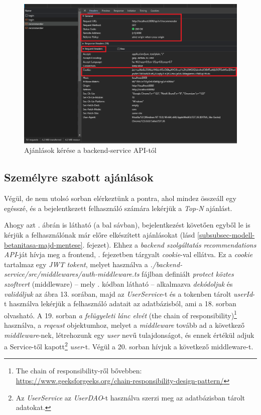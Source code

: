 \documentclass[
]{thesis-ekf}
\theoremstyle{definition}
\theoremstyle{remark}
\begin{document}
\begin{figure}[H]
	\centering
	\includegraphics[width=14cm]{images/frontend-recommender-request.png}
	\caption[Ajánlások kérése a backend-service API-tól]{Ajánlások kérése a backend-service API-tól}
	\label{fig-frontend-rec-request-cookies}
\end{figure}

\subsection{Személyre szabott ajánlások}
Végül, de nem utolsó sorban elérkeztünk a pontra, ahol mindez összeáll egy egésszé, és a bejelentkezett felhasználó számára lekérjük a \emph{Top-N} ajánlást.

Ahogy azt . ábrán is látható (a bal sávban), bejelentkezést követően egyből le is kérjük a felhasználónak már előre elkészített ajánlásokat (lásd \ref{subsubsec-modell-betanitasa-majd-mentese}. fejezet). Ehhez a \emph{backend szolgáltatás} \emph{recommendations API}-ját hívja meg a frontend, . fejezetben tárgyalt \emph{cookie}-val ellátva. Ez a \emph{cookie} tartalmaz egy \emph{JWT tokent}, melyet használva a \emph{./backend-service/src/\allowbreak{}middlewares/auth-middleware.ts} fájlban definiált \emph{protect köztes szoftvert} (middleware) -- mely . kódban látható -- alkalmazva \emph{dekódoljuk} és \emph{validáljuk} az ábra 13. sorában, majd az \emph{UserService}-t és a tokenben tárolt \emph{userId}-t használva lekérjük a felhasználó adatait az adatbázisból, ami a 18. sorban olvasható. A 19. sorban \emph{a felügyeleti lánc elvét} (the chain of responsibility)\footnote{The chain of responsibility-ről bővebben: \url{https://www.geeksforgeeks.org/chain-responsibility-design-pattern/}} használva, a \emph{reqeust} objektumhoz, melyet a \emph{middleware} tovább ad a következő \emph{middleware}-nek, létrehozunk egy \emph{user} nevű tulajdonságot, és ennek értékül adjuk a Service-től kapott\footnote{Az \emph{UserService} az \emph{UserDAO}-t használva szerzi meg az adatbázisban tárolt adatokat.} \emph{user}-t. Végül a 20. sorban hívjuk a következő middleware-t.
\end{document}
